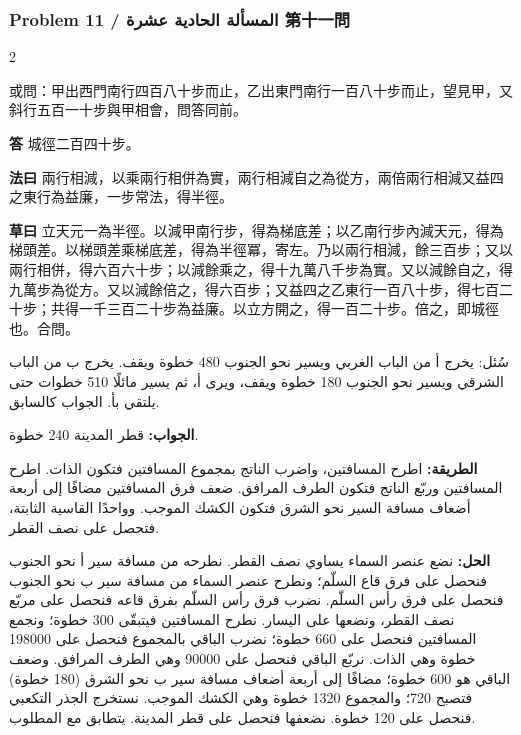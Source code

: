 \documentclass[11pt,a4paper]{article}
\newcommand{\ar}[1]{\arabicfont\beginR #1\endR}
\newcommand{\Answer}[1]{\par\noindent\textbf{\color{problemcolor}答} #1\par}
\newcommand{\Method}[1]{\par\noindent\textbf{\color{problemcolor}法曰} #1\par}
\newcommand{\Workings}[1]{\par\noindent\textbf{\color{problemcolor}草曰} #1\par}
\newcommand{\AnswerAr}{\par\noindent\textbf{\color{problemcolor}\ar{الجواب:}} }
\newcommand{\MethodAr}{\par\noindent\textbf{\color{problemcolor}\ar{الطريقة:}} }
\newcommand{\WorkingsAr}{\par\noindent\textbf{\color{problemcolor}\ar{الحل:}} }
\begin{document}
\vspace{0.5cm}


\subsubsection*{Problem 11 / \ar{المسألة الحادية عشرة} \quad 第十一問}

\begin{paracol}{2}

\noindent 或問：甲出西門南行四百八十步而止，乙出東門南行一百八十步而止，望見甲，又斜行五百一十步與甲相會，問答同前。

\vspace{0.2cm}

\Answer{城徑二百四十步。}

\vspace{0.2cm}

\Method{兩行相減，以乘兩行相併為實，兩行相減自之為從方，兩倍兩行相減又益四之東行為益廉，一步常法，得半徑。}

\vspace{0.2cm}

\Workings{立天元一為半徑。以減甲南行步，得為梯底差；以乙南行步內減天元，得為梯頭差。以梯頭差乘梯底差，得為半徑冪，寄左。乃以兩行相減，餘三百步；又以兩行相併，得六百六十步；以減餘乘之，得十九萬八千步為實。又以減餘自之，得九萬步為從方。又以減餘倍之，得六百步；又益四之乙東行一百八十步，得七百二十步；共得一千三百二十步為益廉。以立方開之，得一百二十步。倍之，即城徑也。合問。}

\switchcolumn

\ar{سُئل: يخرج أ من الباب الغربي ويسير نحو الجنوب 480 خطوة ويقف. يخرج ب من الباب الشرقي ويسير نحو الجنوب 180 خطوة ويقف، ويرى أ، ثم يسير مائلًا 510 خطوات حتى يلتقي بأ. الجواب كالسابق.}

\vspace{0.2cm}

\AnswerAr{قطر المدينة 240 خطوة.}

\vspace{0.2cm}

\MethodAr{اطرح المسافتين، واضرب الناتج بمجموع المسافتين فتكون الذات. اطرح المسافتين وربّع الناتج فتكون الطرف المرافق. ضعف فرق المسافتين مضافًا إلى أربعة أضعاف مسافة السير نحو الشرق فتكون الكشك الموجب. وواحدًا القاسية الثابتة، فتحصل على نصف القطر.}

\vspace{0.2cm}

\WorkingsAr{نضع عنصر السماء يساوي نصف القطر. نطرحه من مسافة سير أ نحو الجنوب فنحصل على فرق قاع السلّم؛ ونطرح عنصر السماء من مسافة سير ب نحو الجنوب فنحصل على فرق رأس السلّم. نضرب فرق رأس السلّم بفرق قاعه فنحصل على مربّع نصف القطر، ونضعها على اليسار. نطرح المسافتين فيتبقّى 300 خطوة؛ ونجمع المسافتين فنحصل على 660 خطوة؛ نضرب الباقي بالمجموع فنحصل على 198000 خطوة وهي الذات. نربّع الباقي فنحصل على 90000 وهي الطرف المرافق. وضعف الباقي هو 600 خطوة؛ مضافًا إلى أربعة أضعاف مسافة سير ب نحو الشرق (180 خطوة) فتصبح 720؛ والمجموع 1320 خطوة وهي الكشك الموجب. نستخرج الجذر التكعبي فنحصل على 120 خطوة. نضعفها فنحصل على قطر المدينة. يتطابق مع المطلوب.}

\end{paracol}
\end{document}
